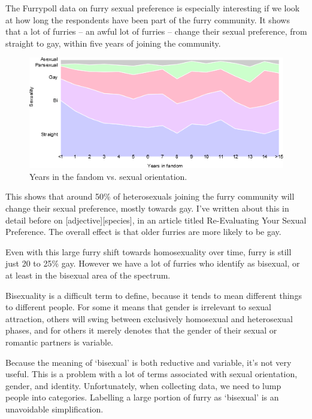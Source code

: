 The Furrypoll data on furry sexual preference is especially interesting if we look at how long the respondents have been part of the furry community. It shows that a lot of furries – an awful lot of furries – change their sexual preference, from straight to gay, within five years of joining the community.

\begin{figure}
  \begin{center}
    \includegraphics[width=\textwidth]{content/assets/not-all-gay--vis}
  \end{center}
  \caption{Years in the fandom vs. sexual orientation.}
\end{figure}

This shows that around 50\% of heterosexuals joining the furry community will change their sexual preference, mostly towards gay. I've written about this in detail before on [adjective][species], in an article titled Re-Evaluating Your Sexual Preference. The overall effect is that older furries are more likely to be gay.

Even with this large furry shift towards homosexuality over time, furry is still just 20 to 25\% gay. However we have a lot of furries who identify as bisexual, or at least in the bisexual area of the spectrum.

Bisexuality is a difficult term to define, because it tends to mean different things to different people. For some it means that gender is irrelevant to sexual attraction, others will swing between exclusively homosexual and heterosexual phases, and for others it merely denotes that the gender of their sexual or romantic partners is variable.

Because the meaning of `bisexual' is both reductive and variable, it's not very useful. This is a problem with a lot of terms associated with sexual orientation, gender, and identity. Unfortunately, when collecting data, we need to lump people into categories. Labelling a large portion of furry as `bisexual' is an unavoidable simplification.

